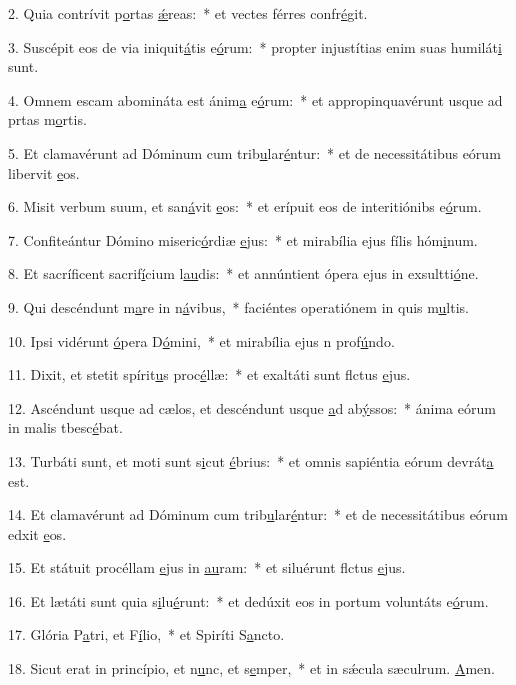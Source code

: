 2. Quia contrívit p\uline{o}rtas \uline{ǽ}reas:~* et vectes férres confr\uline{é}git.\par 
3. Suscépit eos de via iniquit\uline{á}tis e\uline{ó}rum:~* propter injustítias enim suas humilát\uline{i} sunt.\par 
4. Omnem escam abomináta est ánim\uline{a} e\uline{ó}rum:~* et appropinquavérunt usque ad prtas m\uline{o}rtis.\par 
5. Et clamavérunt ad Dóminum cum trib\uline{u}lar\uline{é}ntur:~* et de necessitátibus eórum libervit \uline{e}os.\par 
6. Misit verbum suum, et san\uline{á}vit \uline{e}os:~* et erípuit eos de interitiónibs e\uline{ó}rum.\par 
7. Confiteántur Dómino miseric\uline{ó}rdiæ \uline{e}jus:~* et mirabília ejus fílis hóm\uline{i}num.\par 
8. Et sacríficent sacrif\uline{í}cium l\uline{au}dis:~* et annúntient ópera ejus in exsultti\uline{ó}ne.\par 
9. Qui descéndunt m\uline{a}re in n\uline{á}vibus,~* faciéntes operatiónem in quis m\uline{u}ltis.\par 
10. Ipsi vidérunt \uline{ó}pera D\uline{ó}mini,~* et mirabília ejus n prof\uline{ú}ndo.\par 
11. Dixit, et stetit spírit\uline{u}s proc\uline{é}llæ:~* et exaltáti sunt flctus \uline{e}jus.\par 
12. Ascéndunt usque ad cælos, et descéndunt usque \uline{a}d ab\uline{ý}ssos:~* ánima eórum in malis tbesc\uline{é}bat.\par 
13. Turbáti sunt, et moti sunt s\uline{i}cut \uline{é}brius:~* et omnis sapiéntia eórum devrát\uline{a} est.\par 
14. Et clamavérunt ad Dóminum cum trib\uline{u}lar\uline{é}ntur:~* et de necessitátibus eórum edxit \uline{e}os.\par 
15. Et státuit procéllam \uline{e}jus in \uline{au}ram:~* et siluérunt flctus \uline{e}jus.\par 
16. Et lætáti sunt quia s\uline{i}lu\uline{é}runt:~* et dedúxit eos in portum voluntáts e\uline{ó}rum.\par 
17. Glória P\uline{a}tri, et F\uline{í}lio,~* et Spiríti S\uline{a}ncto.\par 
18. Sicut erat in princípio, et n\uline{u}nc, et s\uline{e}mper,~* et in sǽcula sæculrum. \uline{A}men.\par 
